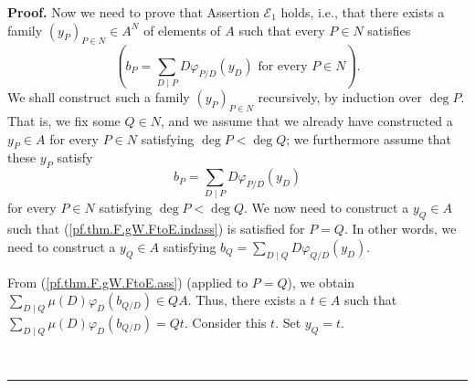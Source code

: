\documentclass[numbers=enddot,12pt,final,onecolumn,notitlepage]{scrartcl}%
\theoremstyle{definition}
\newenvironment{proof}[1][Proof]{\noindent\textbf{#1.} }{\ \rule{0.5em}{0.5em}}
\let\sumnonlimits\sum
\renewcommand{\sum}{\sumnonlimits\limits}
\begin{document}
\begin{proof}
Now we need to prove that Assertion $\mathcal{E}_{1}$ holds, i.e., that there
exists a family $\left(  y_{P}\right)  _{P\in N}\in A^{N}$ of elements of $A$
such that every $P\in N$ satisfies%
\begin{equation}
\left(  b_{P}=\sum_{D\mid P}D\varphi_{P/D}\left(  y_{D}\right)  \text{ for
every }P\in N\right)  . \label{pf.thm.F.gW.FtoE.goal}%
\end{equation}
We shall construct such a family $\left(  y_{P}\right)  _{P\in N}$
recursively, by induction over $\deg P$. That is, we fix some $Q\in N$, and we
assume that we already have constructed a $y_{P}\in A$ for every $P\in N$
satisfying $\deg P<\deg Q$; we furthermore assume that these $y_{P}$ satisfy%
\begin{equation}
b_{P}=\sum_{D\mid P}D\varphi_{P/D}\left(  y_{D}\right)
\label{pf.thm.F.gW.FtoE.indass}%
\end{equation}
for every $P\in N$ satisfying $\deg P<\deg Q$. We now need to construct a
$y_{Q}\in A$ such that (\ref{pf.thm.F.gW.FtoE.indass}) is satisfied for $P=Q$.
In other words, we need to construct a $y_{Q}\in A$ satisfying $b_{Q}%
=\sum_{D\mid Q}D\varphi_{Q/D}\left(  y_{D}\right)  $.

From (\ref{pf.thm.F.gW.FtoE.ass}) (applied to $P=Q$), we obtain $\sum_{D\mid
Q}\mu\left(  D\right)  \varphi_{D}\left(  b_{Q/D}\right)  \in QA$. Thus, there
exists a $t\in A$ such that $\sum_{D\mid Q}\mu\left(  D\right)  \varphi
_{D}\left(  b_{Q/D}\right)  =Qt$. Consider this $t$. Set $y_{Q}=t$.


\end{proof}
\end{document}
